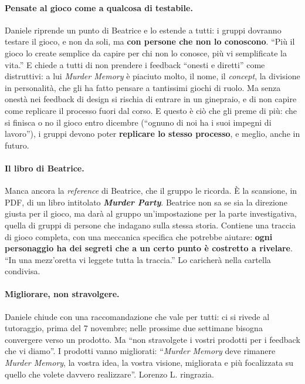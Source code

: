 \paragraph{Pensate al gioco come a qualcosa di testabile.} Daniele riprende un punto di
Beatrice e lo estende a tutti: i gruppi dovranno testare il gioco, e non da soli, ma
\textbf{con persone che non lo conoscono}. ``Più il gioco lo create semplice da capire
per chi non lo conosce, più vi semplificate la vita.'' E chiede a tutti di non prendere i
feedback ``onesti e diretti'' come distruttivi: a lui \emph{Murder Memory} è piaciuto
molto, il nome, il \emph{concept}, la divisione in personalità, che gli ha fatto pensare
a tantissimi giochi di ruolo. Ma senza onestà nei feedback di design si rischia di
entrare in un ginepraio, e di non capire come replicare il processo fuori dal corso.
E questo è ciò che gli preme di più: che si finisca o no il gioco entro dicembre
(``ognuno di noi ha i suoi impegni di lavoro''), i gruppi devono poter \textbf{replicare
lo stesso processo}, e meglio, anche in futuro.

\paragraph{Il libro di Beatrice.} Manca ancora la \emph{reference} di Beatrice, che il
gruppo le ricorda. È la scansione, in PDF, di un libro intitolato \textbf{\emph{Murder
Party}}. Beatrice non sa se sia la direzione giusta per il gioco, ma darà al gruppo
un'impostazione per la parte investigativa, quella di gruppi di persone che indagano
sulla stessa storia. Contiene una traccia di gioco completa, con una meccanica specifica
che potrebbe aiutare: \textbf{ogni personaggio ha dei segreti che a un certo punto è
costretto a rivelare}. ``In una mezz'oretta vi leggete tutta la traccia.'' Lo caricherà
nella cartella condivisa.

\paragraph{Migliorare, non stravolgere.} Daniele chiude con una raccomandazione che vale
per tutti: ci si rivede al tutoraggio, prima del 7 novembre; nelle prossime due
settimane bisogna convergere verso un prodotto. Ma ``non stravolgete i vostri prodotti
per i feedback che vi diamo''. I prodotti vanno migliorati: ``\emph{Murder Memory} deve
rimanere \emph{Murder Memory}, la vostra idea, la vostra visione, migliorata e più
focalizzata su quello che volete davvero realizzare''. Lorenzo L. ringrazia.

